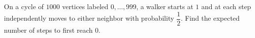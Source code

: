 On a cycle of $1000$ vertices labeled $0,\ldots,999$, a walker starts at $1$ and at each step independently moves to either neighbor with probability $\dfrac{1}{2}$. Find the expected number of steps to first reach $0$.
